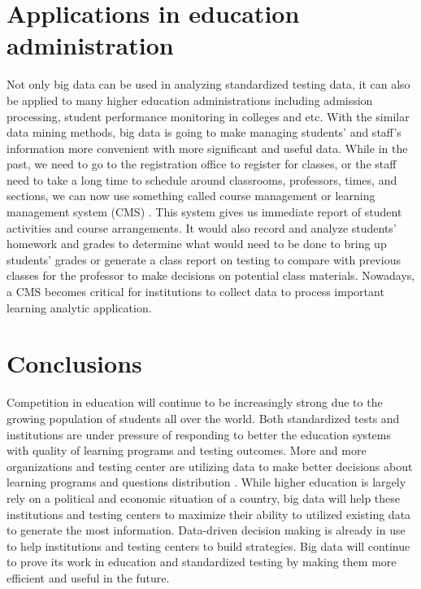 \documentclass[sigconf]{acmart}
\begin{document}
\section{Applications in education administration}
Not only big data can be used in analyzing standardized testing data, it can also be applied to many higher education administrations including admission processing, student performance monitoring in colleges and etc\cite {Picciano2012}. With the similar data mining methods, big data is going to make managing students' and staff's information more convenient with more significant and useful data. While in the past, we need to go to the registration office to register for classes, or the staff need to take a long time to schedule around classrooms, professors, times, and sections, we can now use something called course management or learning management system (CMS) \cite {Picciano2012}. This system gives us immediate report of student activities and course arrangements. It would also record and analyze students' homework and grades to determine what would need to be done to bring up students' grades or 
generate a class report on testing to compare with previous classes for the professor to make decisions on potential class materials. Nowadays, a CMS becomes critical for institutions to collect data to process important learning analytic application.

\section{Conclusions}
Competition in education will continue to be increasingly strong due to the growing population of students all over the world\cite {Selingo2017}. Both standardized tests and institutions are under pressure of responding to better the education systems with quality of learning programs and testing outcomes. More and more organizations and testing center are utilizing data to make better decisions about learning programs and questions distribution \cite {Selingo2017}. While higher education is largely rely on a political and economic situation of a country, big data will help these institutions and testing centers to maximize their ability to utilized existing data to generate the most information. Data-driven decision making is already in use to help institutions and testing centers to build strategies. Big data will continue to prove its work in education and standardized testing by making them more efficient and useful in the future. 





 


\end{document}
